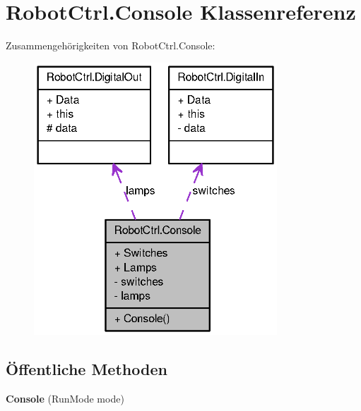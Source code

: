 \hypertarget{class_robot_ctrl_1_1_console}{
\section{RobotCtrl.Console Klassenreferenz}
\label{class_robot_ctrl_1_1_console}
}


Zusammengehörigkeiten von RobotCtrl.Console:\nopagebreak
\begin{figure}[H]
\begin{center}
\leavevmode
\includegraphics[width=258pt]{class_robot_ctrl_1_1_console__coll__graph}
\end{center}
\end{figure}
\subsection*{Öffentliche Methoden}
\begin{DoxyCompactItemize}
\item 
\hypertarget{class_robot_ctrl_1_1_console_a635815d24705bd6de640c1594554962e}{
{\bfseries Console} (RunMode mode)}
\label{class_robot_ctrl_1_1_console_a635815d24705bd6de640c1594554962e}

\end{DoxyCompactItemize}
